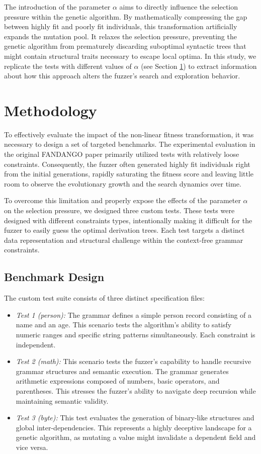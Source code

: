 \documentclass[conference]{IEEEtran}
\begin{document}
The introduction of the parameter $\alpha$ aims to directly influence the selection pressure within the genetic algorithm.
By mathematically compressing the gap between highly fit and poorly fit individuals, this transformation artificially expands the mutation pool. It relaxes the selection pressure, preventing the genetic algorithm from prematurely discarding suboptimal syntactic trees that might contain structural traits necessary to escape local optima.
In this study, we replicate the tests with different values of $\alpha$ (see Section \ref{sec:meth}) to extract information about how this approach alters the fuzzer's search and exploration behavior.



\section{Methodology} \label{sec:meth}
To effectively evaluate the impact of the non-linear fitness transformation, it was necessary to design a set of targeted benchmarks. The experimental evaluation in the original FANDANGO paper primarily utilized tests with relatively loose constraints. Consequently, the fuzzer often generated highly fit individuals right from the initial generations, rapidly saturating the fitness score and leaving little room to observe the evolutionary growth and the search dynamics over time.

To overcome this limitation and properly expose the effects of the parameter $\alpha$ on the selection pressure, we designed three custom tests. These tests were designed with different constraints types, intentionally making it difficult for the fuzzer to easily guess the optimal derivation trees. Each test targets a distinct data representation and structural challenge within the context-free grammar constraints.

\subsection{Benchmark Design}
The custom test suite consists of three distinct specification files:
\begin{itemize}
\item \textit{Test 1 (person):} The grammar defines a simple person record consisting of a name and an age. This scenario tests the algorithm's ability to satisfy numeric ranges and specific string patterns simultaneously. Each constraint is independent.
    \item \textit{Test 2 (math):} This scenario tests the fuzzer's capability to handle recursive grammar structures and semantic execution. The grammar generates arithmetic expressions composed of numbers, basic operators, and parentheses. This stresses the fuzzer's ability to navigate deep recursion while maintaining semantic validity.
    \item \textit{Test 3 (byte):} This test evaluates the generation of binary-like structures and global inter-dependencies. This represents a highly deceptive landscape for a genetic algorithm, as mutating a value might invalidate a dependent field and vice versa.
\end{itemize}
\end{document}
